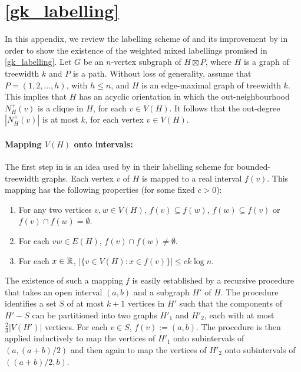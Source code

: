 \documentclass{patmorin}
\renewcommand{\le}{\leqslant}
\newcommand{\defin}[1]{\emph{\textcolor{brightmaroon}{#1}}}
\begin{document}
\setlength{\bibsep}{0.3ex plus 0.1ex minus 0.1ex}



  \appendix

\section{\cref{gk_labelling}}
  \label{weighted_product_proof}

  In this appendix, we review the labelling scheme of \citet{dujmovic.esperet.ea:adjacency} and its improvement by \citet{gawrychowski.janczewski:simpler} in order to show the existence of the weighted mixed labellings promised in \cref{gk_labelling}.
  Let $G$ be an $n$-vertex subgraph of $H\boxtimes P$, where $H$ is a graph of treewidth $k$ and $P$ is a path. Without loss of generality, assume that $P=(1,2,\dots,h)$, with $h\le n$, and $H$ is an edge-maximal graph of treewidth $k$.  This implies that $H$ has an acyclic orientation in which the out-neighbourhood $N^+_H(v)$ is a clique in $H$, for each $v\in V(H)$.
  It follows that the out-degree $|N^+_H(v)|$ is at most $k$, for each vertex $v\in V(H)$.

  \paragraph{\boldmath Mapping $V(H)$ onto intervals:}
  The first step in \cite{dujmovic.esperet.ea:adjacency} is an idea used by \citet{gavoille.labourel:shorter} in their labelling scheme for bounded-treewidth graphs.
  Each vertex $v$ of $H$ is mapped to a real interval \defin{$f(v)$}.
  This mapping has the following properties (for some fixed $c>0$):
  \begin{enumerate}[nosep]
      \item\label{nested_or_disjoint} For any two vertices $v,w\in V(H)$, $f(v)\subseteq f(w)$, $f(w)\subseteq f(v)$ or $f(v)\cap f(w)=\emptyset$.
      \item\label{intersection_subgraph} For each $vw\in E(H)$, $f(v)\cap f(w)\neq\emptyset$.
      \item\label{thin} For each $x\in \mathbb{R}$, $|\{v\in V(H):x\in f(v)\}|\le ck\log n$.
  \end{enumerate}

  The existence of such a mapping $f$ is easily established by a recursive procedure that takes an open interval $(a,b)$ and a subgraph $H'$ of $H$.
  The procedure identifies a set $S$ of at most $k+1$ vertices in $H'$ such that the components of $H'-S$ can be partitioned into two graphs $H'_1$ and $H'_2$, each with at most $\tfrac{2}{3}|V(H')|$ vertices.
  For each $v\in S$, $f(v):=(a,b)$.  The procedure is then applied inductively to map the vertices of $H'_1$ onto subintervals of $(a,(a+b)/2)$ and then again to map the vertices of $H'_2$ onto subintervals of $((a+b)/2,b)$.
\end{document}
